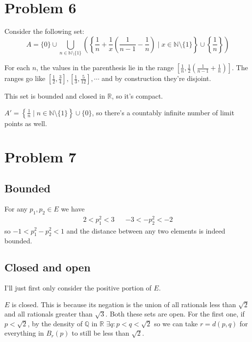 \documentclass[12pt]{article}
\newcommand{\N}{\mathbb{N}}
\newcommand{\R}{\mathbb{R}}
\newcommand{\Q}{\mathbb{Q}}
\begin{document}
\section{Problem 6}

Consider the following set:
\[A=\{0\} \cup
  \bigcup_{n \in \N \setminus \{1\}}
  \left(\left\{\frac{1}{n} + \frac{1}{x}\left(\frac{1}{n-1}-\frac{1}{n}\right)
  \mid x \in \N \setminus \{1\}\right\}
  \cup \left\{\frac{1}{n}\right\}\right)\]

For each $n$, the values in the parenthesis lie in the range $\left[\frac{1}{n}, \frac{1}{2}\left(\frac{1}{n-1}+\frac{1}{n}\right)\right]$.
The ranges go like $\left[\frac{1}{2}, \frac{3}{4}\right], \left[\frac{1}{3}, \frac{5}{12}\right], \cdots$
and by construction they're disjoint.

This set is bounded and closed in $\R$, so it's compact.

$A'=\left\{\frac{1}{n} \mid n \in \N \setminus \{1\}\right\} \cup \{0\}$,
so there's a countably infinite number of limit points as well.

\pagebreak

\section{Problem 7}

\subsection{Bounded}

For any $p_1, p_2 \in E$ we have
\begin{align*}
  2 < p_1^2 < 3 &  & -3 < -p_2^2 < -2
\end{align*}
so $-1 < p_1^2-p_2^2 < 1$ and the distance between any two elements is indeed bounded.

\subsection{Closed and open}

I'll just first only consider the positive portion of $E$.

$E$ is closed.
This is because its negation is the union of all rationals less than $\sqrt{2}$ and all rationals greater than $\sqrt{3}$.
Both these sets are open.
For the first one, if $p < \sqrt{2}$,
by the density of $\Q$ in $\R$ $\exists q: p < q < \sqrt{2}$ so we can take
$r=d(p, q)$ for everything in $B_r(p)$ to still be less than $\sqrt{2}$.
\end{document}
